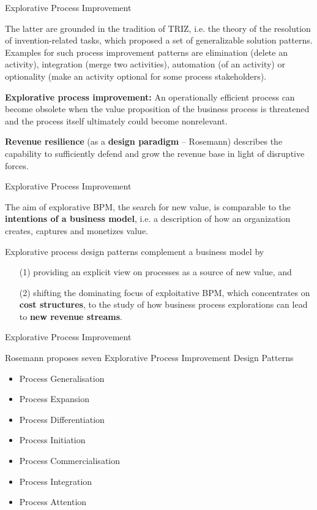 \documentclass{beamer}
\begin{document}
\begin{frame}{Explorative Process Improvement}

  The latter are grounded in the tradition of TRIZ, i.e. the theory of the
  resolution of invention-related tasks, which proposed a set of generalizable
  solution patterns. Examples for such process improvement patterns are
  elimination (delete an activity), integration (merge two activities),
  automation (of an activity) or optionality (make an activity optional for
  some process stakeholders).
  
  \textbf{Explorative process improvement:} An operationally efficient process
  can become obsolete when the value proposition of the business process is
  threatened and the process itself ultimately could become nonrelevant.

  \textbf{Revenue resilience} (as a \textbf{design paradigm} -- Rosemann)
  describes the capability to sufficiently defend and grow the revenue base in
  light of disruptive forces.

\end{frame}

\begin{frame}{Explorative Process Improvement}
  
  The aim of explorative BPM, the search for new value, is comparable to the
  \textbf{intentions of a business model}, i.e. a description of how an
  organization creates, captures and monetizes value.

  Explorative process design patterns complement a business model by 
  \begin{itemize}
  \item[(1)] providing an explicit view on processes as a source of new value,
    and 
  \item[(2)] shifting the dominating focus of exploitative BPM, which
    concentrates on \textbf{cost structures}, to the study of how business
    process explorations can lead to \textbf{new revenue streams}.
  \end{itemize}

\end{frame}

\begin{frame}{Explorative Process Improvement}
  
  Rosemann proposes seven Explorative Process Improvement Design Patterns
  \begin{itemize}
  \item Process Generalisation
  \item Process Expansion
  \item Process Differentiation
  \item Process Initiation
  \item Process Commercialisation
  \item Process Integration
  \item Process Attention
  \end{itemize}
  
\end{frame}
  
\end{document}
